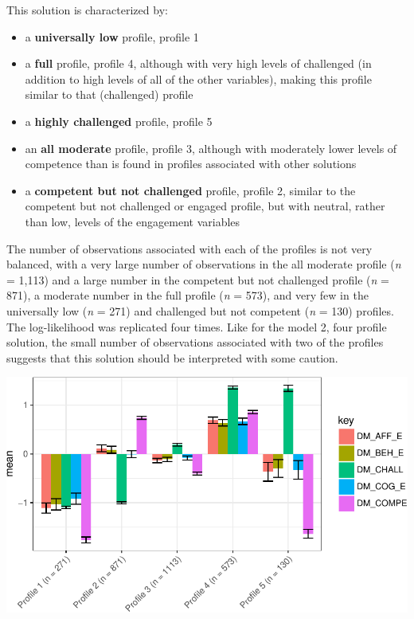 \documentclass[]{book}
\providecommand{\tightlist}{%
  \setlength{\itemsep}{0pt}\setlength{\parskip}{0pt}}
\theoremstyle{definition}
\theoremstyle{definition}
\theoremstyle{definition}
\theoremstyle{remark}
\begin{document}
This solution is characterized by:

\begin{itemize}
\tightlist
\item
  a \textbf{universally low} profile, profile 1
\item
  a \textbf{full} profile, profile 4, although with very high levels of
  challenged (in addition to high levels of all of the other variables),
  making this profile similar to that (challenged) profile
\item
  a \textbf{highly challenged} profile, profile 5
\item
  an \textbf{all moderate} profile, profile 3, although with moderately
  lower levels of competence than is found in profiles associated with
  other solutions
\item
  a \textbf{competent but not challenged} profile, profile 2, similar to
  the competent but not challenged or engaged profile, but with neutral,
  rather than low, levels of the engagement variables
\end{itemize}

The number of observations associated with each of the profiles is not
very balanced, with a very large number of observations in the all
moderate profile (\emph{n} = 1,113) and a large number in the competent
but not challenged profile (\emph{n} = 871), a moderate number in the
full profile (\emph{n} = 573), and very few in the universally low
(\emph{n} = 271) and challenged but not competent (\emph{n} = 130)
profiles. The log-likelihood was replicated four times. Like for the
model 2, four profile solution, the small number of observations
associated with two of the profiles suggests that this solution should
be interpreted with some caution.

\begin{center}\includegraphics[width=0.8\linewidth]{rosenberg-dissertation_files/figure-latex/m2_5p-1} \end{center}
\end{document}
